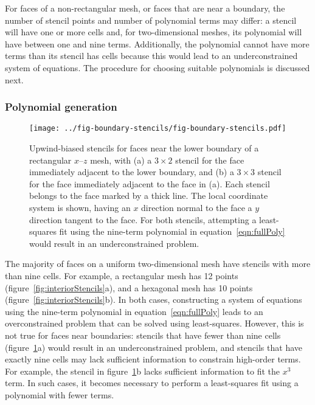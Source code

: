 For faces of a non-rectangular mesh, or faces that are near a boundary, the number of stencil points and number of polynomial terms may differ: a stencil will have one or more cells and, for two-dimensional meshes, its polynomial will have between one and nine terms.  Additionally, the polynomial cannot have more terms than its stencil has cells because this would lead to an underconstrained system of equations.  The procedure for choosing suitable polynomials is discussed next.

\subsubsection{Polynomial generation}
\label{sec:polyCandidates}
\begin{figure}
	\centering
	\texttt{[image: ../fig-boundary-stencils/fig-boundary-stencils.pdf]}
	\caption{Upwind-biased stencils for faces near the lower boundary of a rectangular $x$--$z$ mesh, with (a) a $3 \times 2$ stencil for the face immediately adjacent to the lower boundary, and (b) a $3 \times 3$ stencil for the face immediately adjacent to the face in (a).  Each stencil belongs to the face marked by a thick line.  The local coordinate system is shown, having an $x$ direction normal to the face a $y$ direction tangent to the face.  For both stencils, attempting a least-squares fit using the nine-term polynomial in equation~\eqref{eqn:fullPoly} would result in an underconstrained problem.
	}
	\label{fig:boundaryStencils}
\end{figure}

The majority of faces on a uniform two-dimensional mesh have stencils with more than nine cells.  For example, a rectangular mesh has 12 points (figure~\ref{fig:interiorStencils}a), and a hexagonal mesh has 10 points (figure~\ref{fig:interiorStencils}b).
In both cases, constructing a system of equations using the nine-term polynomial in equation~\eqref{eqn:fullPoly} leads to an overconstrained problem that can be solved using least-squares.  However, this is not true for faces near boundaries: stencils that have fewer than nine cells (figure~\ref{fig:boundaryStencils}a) would result in an underconstrained problem, and stencils that have exactly nine cells may lack sufficient information to constrain high-order terms.  For example, the stencil in figure~\ref{fig:boundaryStencils}b lacks sufficient information to fit the $x^3$ term.  In such cases, it becomes necessary to perform a least-squares fit using a polynomial with fewer terms.

